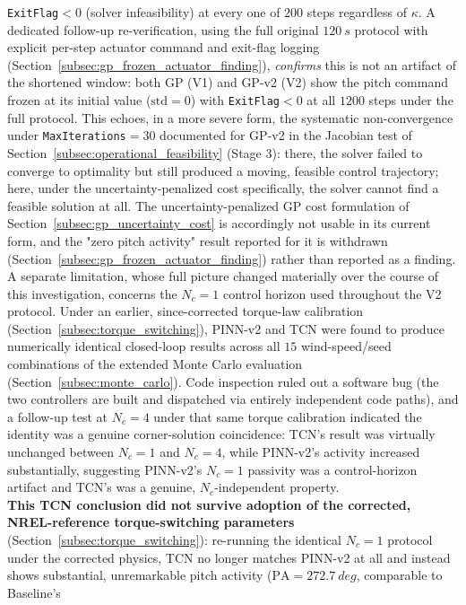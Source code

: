 \texttt{ExitFlag}$<0$ (solver infeasibility) at every one of $200$
steps regardless of $\kappa$. A dedicated follow-up re-verification,
using the full original $\SI{120}{s}$ protocol with explicit per-step
actuator command and exit-flag logging (Section~\ref{subsec:gp_frozen_actuator_finding}),
\emph{confirms} this is not an artifact of the shortened window: both
GP (V1) and GP-v2 (V2) show the pitch command frozen at its initial
value ($\text{std}=0$) with \texttt{ExitFlag}$<0$ at all $1200$ steps
under the full protocol. This echoes, in a more severe form, the
systematic
non-convergence under \texttt{MaxIterations}$=30$ documented for
GP-v2 in the Jacobian test of Section~\ref{subsec:operational_feasibility}
(Stage 3): there, the solver failed to converge to optimality but still
produced a moving, feasible control trajectory; here, under the
uncertainty-penalized cost specifically, the solver cannot find a
feasible solution at all. The uncertainty-penalized GP cost formulation
of Section~\ref{subsec:gp_uncertainty_cost} is accordingly not usable
in its current form, and the "zero pitch activity" result reported for
it is withdrawn (Section~\ref{subsec:gp_frozen_actuator_finding}) rather
than reported as a finding. A separate limitation, whose full picture changed materially over the
course of this investigation, concerns the $N_c=1$ control horizon used
throughout the V2 protocol. Under an earlier, since-corrected torque-law
calibration (Section~\ref{subsec:torque_switching}), PINN-v2 and TCN were
found to produce numerically identical closed-loop results across all
$15$ wind-speed/seed combinations of the extended Monte Carlo evaluation
(Section~\ref{subsec:monte_carlo}). Code inspection ruled out a software
bug (the two controllers are built and dispatched via entirely
independent code paths), and a follow-up test at $N_c=4$ under that same
torque calibration indicated the identity was a genuine corner-solution
coincidence: TCN's result was virtually unchanged between $N_c=1$ and
$N_c=4$, while PINN-v2's activity increased substantially, suggesting
PINN-v2's $N_c=1$ passivity was a control-horizon artifact and TCN's was
a genuine, $N_c$-independent property.\\ \textbf{This TCN conclusion did
not survive adoption of the corrected, NREL-reference torque-switching
parameters} (Section~\ref{subsec:torque_switching}): re-running the
identical $N_c=1$ protocol under the corrected physics, TCN no longer
matches PINN-v2 at all and instead shows substantial, unremarkable pitch
activity ($\text{PA}=\SI{272.7}{deg}$, comparable to Baseline's
